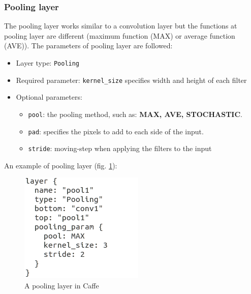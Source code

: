 \subsubsection{Pooling layer}
The pooling layer works similar to a convolution layer but the functions at pooling layer are different (maximum function (MAX) or average function (AVE)). The parameters of pooling layer are followed:
\begin{itemize}
	\item Layer type: \texttt{Pooling}
	\item Required parameter: \texttt{kernel\_size} specifies width and height of each filter
	\item Optional parameters:
		\begin{itemize}
			\item \texttt{pool}: the pooling method, such as: \textbf{MAX, AVE, STOCHASTIC}.
			\item \texttt{pad}: specifies the pixels to add to each side of the input.
			\item \texttt{stride}: moving-step when applying the filters to the input
		\end{itemize}
\end{itemize}
An example of pooling layer (fig. \ref{figstpool}):
\begin{figure}[!h]
	\centering
	\includegraphics[scale=0.7]{images/stpool}
	\caption{A pooling layer in Caffe}
	\label{figstpool}
\end{figure}
